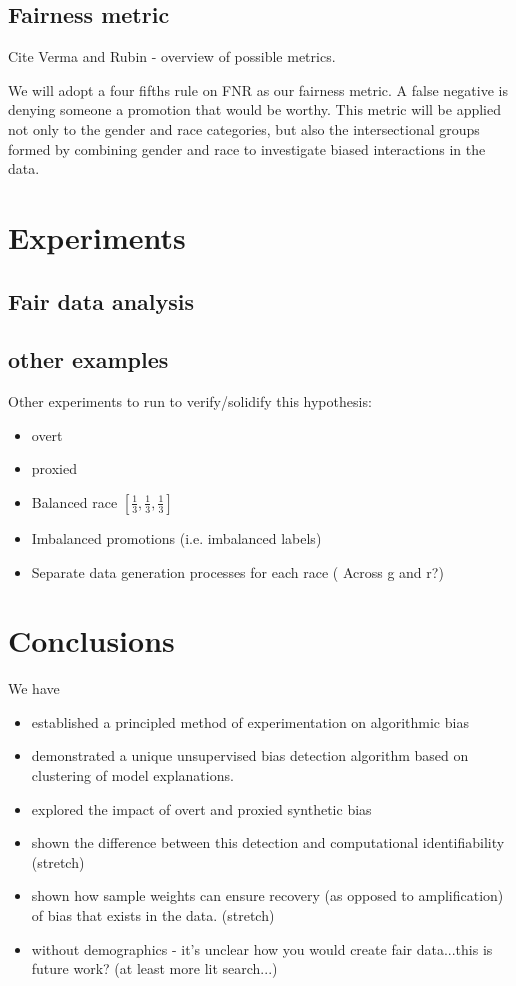 \documentclass[manuscript,screen,review]{acmart}
\begin{document}
\subsection{Fairness metric}
Cite Verma and Rubin - overview of possible metrics.

We will adopt a four fifths rule on FNR as our fairness metric.  A false negative is denying someone a promotion that would be worthy.  This metric will be applied not only to the gender and race categories, but also the intersectional groups formed by combining gender and race to investigate biased interactions in the data.

\section{Experiments}

\subsection{Fair data analysis}

\subsection{other examples}
Other experiments to run to verify/solidify this hypothesis:

\begin{itemize}
    \item overt
    \item proxied
    \item Balanced race $[\frac{1}{3}, \frac{1}{3}, \frac{1}{3}] $
    \item Imbalanced promotions (i.e. imbalanced labels)
    \item Separate data generation processes for each race ( Across g and r?)
\end{itemize}


\section{Conclusions}
We have 
\begin{itemize}
    \item established a principled method of experimentation on algorithmic bias 
    \item demonstrated a unique unsupervised bias detection algorithm based on clustering of model explanations.
    \item explored the impact of overt and proxied synthetic bias
    \item shown the difference between this detection and computational identifiability (stretch)
    \item shown how sample weights can ensure recovery (as opposed to amplification) of bias that exists in the data. (stretch)
    \item without demographics - it's unclear how you would create fair data...this is future work?  (at least more lit search...)
\end{itemize}
\end{document}
